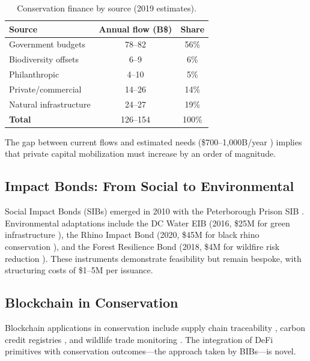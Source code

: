 \documentclass[11pt,a4paper]{article}
\begin{document}
\begin{table}[H]
\centering
\caption{Conservation finance by source (2019 estimates).}
\label{tab:finance}
\begin{tabular}{lcc}
\toprule
\textbf{Source} & \textbf{Annual flow (B\$)} & \textbf{Share} \\
\midrule
Government budgets     & 78--82  & 56\% \\
Biodiversity offsets   & 6--9    & 6\% \\
Philanthropic          & 4--10   & 5\% \\
Private/commercial     & 14--26  & 14\% \\
Natural infrastructure & 24--27  & 19\% \\
\midrule
\textbf{Total}         & 126--154 & 100\% \\
\bottomrule
\end{tabular}
\end{table}

The gap between current flows and estimated needs (\$700--1{,}000B/year
\citep{paulson2020financing}) implies that private capital mobilization
must increase by an order of magnitude.

\subsection{Impact Bonds: From Social to Environmental}

Social Impact Bonds (SIBs) emerged in 2010 with the Peterborough Prison
SIB \citep{liebman2011social}. Environmental adaptations include the DC
Water EIB (2016, \$25M for green infrastructure
\citep{nicola2013quantifying}), the Rhino Impact Bond (2020, \$45M for
black rhino conservation \citep{uct2020rhino}), and the Forest
Resilience Bond (2018, \$4M for wildfire risk reduction
\citep{blue2019forest}). These instruments demonstrate feasibility but
remain bespoke, with structuring costs of \$1--5M per issuance.

\subsection{Blockchain in Conservation}

Blockchain applications in conservation include supply chain
traceability \citep{howson2019crypto}, carbon credit registries
\citep{schletz2020blockchain}, and wildlife trade monitoring
\citep{dalton2020blockchain}. The integration of DeFi primitives with
conservation outcomes---the approach taken by BIBs---is novel.
\end{document}
